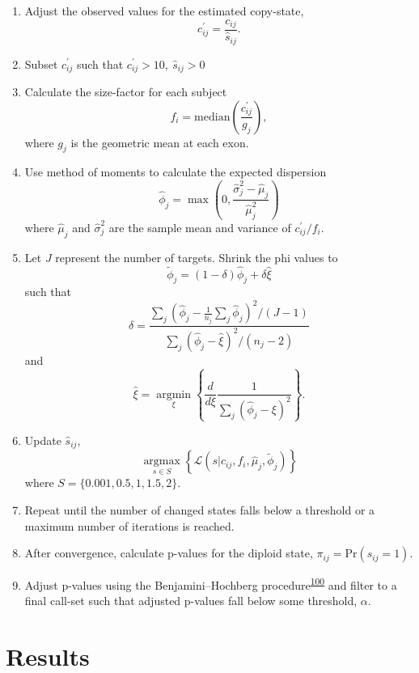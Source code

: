 \documentclass[11pt,letterpaper,oneside]{book}
\begin{document}
\begin{enumerate}
\def\labelenumi{\arabic{enumi}.}
\item
  Adjust the observed values for the estimated copy-state,
  \[
    c_{ij}^{\prime} = \frac{c_{ij}}{\hat{s}_{ij}}.
    \]
\item
  Subset \(c_{ij}^{\prime}\) such that \(c_{ij}^{\prime} > 10, ~ \hat{s}_{ij} > 0\)
\item
  Calculate the size-factor for each subject
  \[
    f_i = \text{median}\left(\frac{c_{ij}^{\prime}}{g_j}\right),
    \]
  where \(g_j\) is the geometric mean at each exon.
\item
  Use method of moments to calculate the expected dispersion
  \[
    \hat\phi_j = \max\left(0, \frac{\hat\sigma_j^2 - \hat{\mu}_j}{\hat{\mu}_j^2}\right)
    \]
  where \(\hat{\mu}_j\) and \(\hat{\sigma}_j^2\) are the sample mean and variance of \(c_{ij}^{\prime}/f_i\).
\item
  Let \(J\) represent the number of targets. Shrink the phi values to
  \[
    \tilde\phi_j = (1 - \delta)\hat\phi_j + \delta\hat{\xi}
    \]
  such that
  \[
    \delta = \frac{\sum\limits_j\left(\hat\phi_j - \frac{1}{n_j}\sum\limits_j \hat\phi_j\right)^2/(J - 1)}
    {\sum\limits_j\left(\hat\phi_j - \hat{\xi}\right)^2/(n_j - 2)}
    \]
  and
  \[
    \hat{\xi} = \mathop{\text{argmin}}\limits_{\xi}\left\{
    \frac{d}{d\xi}\frac{1}{\sum\limits_j \left(\hat\phi_j - \xi\right)^2}
    \right\}.
    \]
\item
  Update \(\hat{s}_{ij}\),
  \[
    \mathop{\text{argmax}}\limits_{s \in S}\left\{
    \mathcal{L}(s \rvert c_{ij},f_i,\hat\mu_j,\tilde\phi_j)
    \right\}
    \]
  where \(S = \{0.001, 0.5, 1, 1.5, 2\}\).
\item
  Repeat until the number of changed states falls below a threshold or a maximum number of iterations is reached.
\item
  After convergence, calculate p-values for the diploid state, \(\pi_{ij} = \text{Pr}(s_{ij} = 1)\).
\item
  Adjust p-values using the Benjamini--Hochberg procedure\textsuperscript{\protect\hyperlink{ref-benjamini:1995aa}{100}} and filter to a final call-set such that adjusted p-values fall below some threshold, \(\alpha\).
\end{enumerate}

\hypertarget{results}{%
\section{Results}\label{results}}
\end{document}
